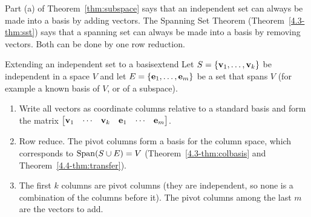 \documentclass[11pt]{article}
\begin{document}
Part (a) of Theorem~\ref{thm:subspace} says that an independent set can always be made into a basis by adding vectors. The Spanning Set Theorem (Theorem~\ref{4.3-thm:sst}) says that a spanning set can always be made into a basis by removing vectors. Both can be done by one row reduction.

\begin{proc}{Extending an independent set to a basis}{extend}
Let $S=\{\mathbf{v}_1,\dots,\mathbf{v}_k\}$ be independent in a space $V$ and let $E=\{\mathbf{e}_1,\dots,\mathbf{e}_m\}$ be a set that spans $V$ (for example a known basis of $V$, or of a subspace).
\begin{enumerate}
  \item Write all vectors as coordinate columns relative to a standard basis and form the matrix $\begin{bmatrix}\mathbf{v}_1&\cdots&\mathbf{v}_k&\mathbf{e}_1&\cdots&\mathbf{e}_m\end{bmatrix}$.
  \item Row reduce. The pivot columns form a basis for the column space, which corresponds to $\operatorname{Span}(S\cup E)=V$ (Theorem~\ref{4.3-thm:colbasis} and Theorem~\ref{4.4-thm:transfer}).
  \item The first $k$ columns are pivot columns (they are independent, so none is a combination of the columns before it). The pivot columns among the last $m$ are the vectors to add.
\end{enumerate}
\end{proc}
\end{document}
